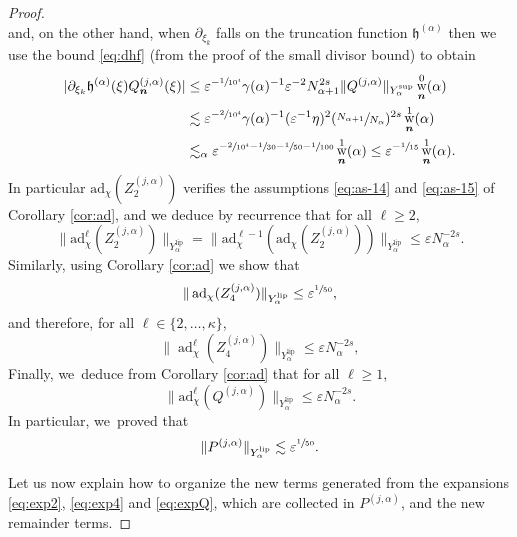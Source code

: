 \documentclass[10pt,a4paper]{amsart}
\DeclareMathOperator{\rw}{w}
\theoremstyle{plain}
\theoremstyle{definition}
\newcommand{\nb}{{\boldsymbol n}}
\newcommand{\1}{\mathbf{1}}
\newcommand{\Ysup}[1]{Y_{#1}^{\mathrm{sup}}}
\newcommand{\Ylip}[1]{Y_{#1}^{\mathrm{lip}}}
\let\epsilon\varepsilon
\begin{document}
\begin{proof}
\[\]
and, on the other hand, when $\partial_{\xi_{k}}$ falls on the truncation function $\mathfrak{h}^{(\alpha)}$ then we use the bound \eqref{eq:dhf} (from the proof of the small divisor bound) to obtain
\begin{align*}
|\partial_{\xi_{k}}\mathfrak{h}^{(\alpha)}(\xi)Q^{(j,\alpha)}_{\nb}(\xi)|
&\leq
\epsilon^{-\sfrac{1}{10^{4}}}\gamma(\alpha)^{-1}\epsilon^{-2}N_{\alpha+1}^{2s}
\|Q^{(j,\alpha)}\|_{\Ysup{\alpha}}\rw_{\nb}^{0}(\alpha) \\
&\lesssim\epsilon^{-\sfrac{2}{10^{4}}}\gamma(\alpha)^{-1}
(\epsilon^{-1}\eta)^{2}
(\sfrac{N_{\alpha+1}}{N_{\alpha}})^{2s}
\rw_{\nb}^{1}(\alpha) \\
&\lesssim_{\alpha}
\epsilon^{-\sfrac{2}{10^{4}}-\sfrac{1}{30}-\sfrac{1}{50}-\sfrac{1}{100}} \rw_{\nb}^{1}(\alpha)
\leq
\epsilon^{-\sfrac{1}{15}}\rw_{\nb}^{1}(\alpha).
\end{align*}
In particular $\mathrm{ad}_{\chi}(Z_{2}^{(j,\alpha)})$ verifies the assumptions \eqref{eq:as-14} and \eqref{eq:as-15} of Corollary \ref{cor:ad}, and we deduce by recurrence that for all $\ell\geq2$,
\begin{equation}
\label{eq:adZ1}
\|\mathrm{ad}_{\chi}^{\ell}(Z_{2}^{(j,\alpha)})\|_{\Ylip{\alpha}}
=
\|
\mathrm{ad}_{\chi}^{\ell-1}(\mathrm{ad}_{\chi}(Z_{2}^{(j,\alpha)}))
\|_{\Ylip{\alpha}}
\leq
\epsilon N_{\alpha}^{-2s}.
\end{equation}
Similarly, using Corollary \ref{cor:ad} we show that
\[
\|\operatorname{ad}_{\chi}(Z_{4}^{(j,\alpha)})\|_{\Ylip{\alpha}} \leq \epsilon^{\sfrac{1}{50}},
\]
and therefore, for all $\ell\in\{2,\dots,\kappa\}$,
\begin{equation}
\label{eq:adZ41}
\|\operatorname{ad}_{\chi}^{\ell}(Z_{4}^{(j,\alpha)})\|_{\Ylip{\alpha}} \leq \epsilon N_{\alpha}^{-2s},
\end{equation}
Finally, we~deduce from Corollary \ref{cor:ad} that for all $\ell\geq1$,
\begin{equation}
\label{eq:adQ1}
\|\mathrm{ad}_{\chi}^{\ell}(Q^{(j,\alpha)})\|_{\Ylip{\alpha}}
\leq \epsilon N_{\alpha}^{-2s}.
\end{equation}
In particular, we~proved that
\begin{equation}
\label{eq:Ptilde1}
\|P^{(j,\alpha)}\|_{\Ylip{\alpha}}\lesssim \epsilon^{\sfrac{1}{50}}.
\end{equation}

Let us now explain how to organize the new terms generated from the expansions \eqref{eq:exp2}, \eqref{eq:exp4} and \eqref{eq:expQ}, which are collected in $P^{(j,\alpha)}$, and the new remainder terms.


\end{proof}
\end{document}
